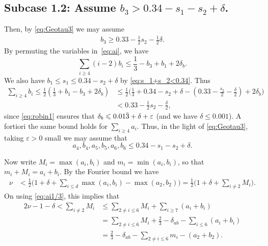 \subsection*{Subcase 1.2:  Assume $b_3> 0.34-s_1-s_2+\delta$.}
Then, by \eqref{eq:Geotau3} we may assume
\begin{align}\label{eq:b3}
b_3\geq 0.33 -\frac{1}{2}s_2-\frac{1}{2}\delta.
\end{align}
By permuting the variables in~\eqref{eq:ai}, we have
$$
\sum_{i\ge4} (i-2)b_i\le\frac{1}{3}-b_3+b_1 + 2\delta_b.
$$
We also have
$b_1\leq s_1\leq 0.34 -s_2+\delta$
by \eqref{eq:s_1+s_2<0.34}.
Thus
\begin{align*}
\sum_{i\geq 4}b_i  \le \frac{1}{2}\left(\frac{1}{3}+b_1-b_3+2\delta_b\right)
&\le \frac{1}{2}\Big(\frac{1}{3}+0.34
-s_2+\delta
-
(0.33
-\frac{s_2}{2}
-\frac{\delta}{2})
+2\delta_b\Big)\\  &<  0.33-\frac{1}{2}s_2-\frac{\delta}{2},
\end{align*}
since
\eqref{eq:robin1} ensures that $\delta_b\leqslant 0.01\bar 3+\delta+\varepsilon$ (and we have $\delta\leq 0.001$). A fortiori the same bound holds for $\sum_{i\geq 4}a_i$. Thus, in the light of \eqref{eq:Geotau3}, taking $\varepsilon>0$ small we may assume that
$$
a_4,b_4,a_5,b_5,a_6,b_6\leq 0.34-s_1-s_2+\delta.
$$

Now write $M_i = \max(a_i,b_i)$ and  $m_i = \min(a_i,b_i)$, so that  $m_i+M_i=a_i+b_i$. By the Fourier bound we have
\begin{align*}
\nu & < \frac{1}{2}\Big(1+\delta+ \sum_{i\leq d} \max(a_i,b_i) - \max(a_2,b_2)\Big) = \frac{1}{2}\Big(1 +\delta+ \sum_{i\neq 2}M_i\Big).
\end{align*}
On using \eqref{eq:ai1/3},
this implies that
\begin{align*}
2\nu -1-\delta  < \sum_{i\neq 2} M_i  &\le \sum_{2\neq i \le 6}M_i + \sum_{i\ge7} (a_i+b_i)\\
&= \sum_{2\neq i \le 6}M_i + \frac{2}{3} -\delta_{ab} - \sum_{i\le 6}(a_i+b_i)\\
&= \frac{2}{3} -\delta_{ab}-\sum_{2\neq i \le 6}m_i - (a_2+b_2).
\end{align*}

